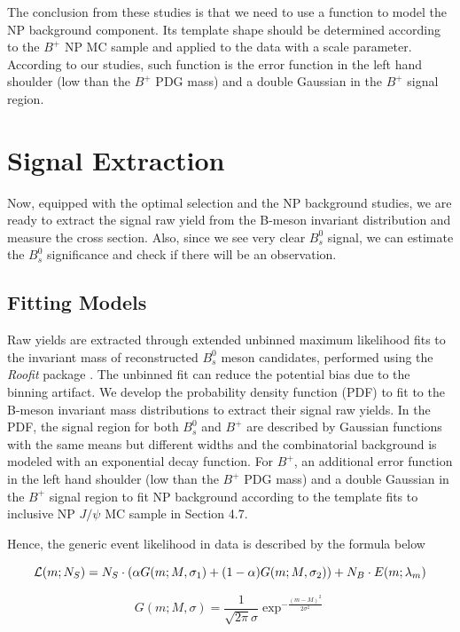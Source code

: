 The conclusion from these studies is that we need to use a function to model the NP background component. Its template shape should be determined according to the $B^+$ NP MC sample and applied to the data with a scale parameter. According to our studies, such function is the error function in the left hand shoulder (low than the $B^+$ PDG mass) and a double Gaussian in the $B^+$ signal region.

\section{Signal Extraction} 

Now, equipped with the optimal selection and the NP background studies, we are ready to extract the signal raw yield from the B-meson invariant distribution and measure the cross section. Also, since we see very clear $B^0_s$ signal, we can estimate the $B^0_s$ significance and check if there will be an observation.

\subsection{Fitting Models}

Raw yields are extracted through extended unbinned maximum likelihood fits to the invariant mass of reconstructed $B^0_s$ meson candidates, performed using the \textit{Roofit} package \cite{ROOFIT}. The unbinned fit can reduce the potential bias due to the binning artifact. We develop the probability density function (PDF) to fit to the B-meson invariant mass distributions to extract their signal raw yields. In the PDF, the signal region for both $B^0_s$ and $B^+$ are described by Gaussian functions with the same means but different widths and the combinatorial background is modeled with an exponential decay function. For $B^+$, an additional error function in the left hand shoulder (low than the $B^+$ PDG mass) and a double Gaussian in the $B^+$ signal region to fit NP background according to the template fits to inclusive NP $J/\psi$ MC sample in Section 4.7. 

Hence, the generic event likelihood in data is described by the formula below

\begin{equation}
{\cal{L}}(m;N_S) = N_S \cdot (\alpha G(m;M,\sigma_1) + (1-\alpha) G(m; M,\sigma_2))+ N_B \cdot E(m;\lambda_m)
\end{equation}

\begin{equation}
G(m;M,\sigma) = \frac{1}{\sqrt{2\pi}\sigma} \exp^{-\frac{(m-M)^2}{2\sigma^2}} 
\end{equation}

